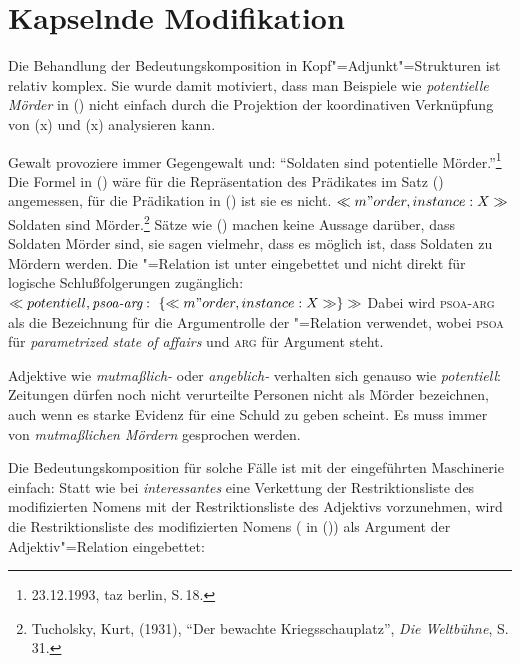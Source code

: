 \section{Kapselnde Modifikation}
\label{sec-kapselnde-Modifikation}

Die Behandlung der Bedeutungskomposition in Kopf"=Adjunkt"=Strukturen ist relativ komplex.
Sie wurde damit motiviert, dass man Beispiele wie \emph{potentielle Mörder} in ()
nicht einfach durch die Projektion der koordinativen Verknüpfung
von (x) und (x) analysieren kann.
\ea
\label{soldat}

Gewalt provoziere immer Gegengewalt und: "`Soldaten sind potentielle Mörder."'\footnote{
23.12.1993, taz berlin, S.\,18.
}
\z
Die Formel in () wäre für die Repräsentation des Prädikates im Satz () angemessen, für
die Prädikation in () ist sie es nicht.
\ea
$\ll m"order, instance:X\gg$
\z
\ea
Soldaten sind Mörder.\footnote{
  Tucholsky, Kurt, (1931), "`Der bewachte Kriegsschauplatz"', \emph{Die Weltbühne}, S.\,31.
}
\z
Sätze wie () machen keine Aussage darüber, dass Soldaten Mörder sind, sie sagen vielmehr,
dass es möglich ist, dass Soldaten zu Mördern werden. Die "=Relation ist unter 
eingebettet und nicht direkt für logische Schlußfolgerungen zugänglich:
\ea
\label{pot}
$\ll potentiell, \textit{psoa-arg} : ~\{ \ll m"order, instance:X\gg \} \gg$
\z
Dabei wird \textsc{psoa-arg} als die Bezeichnung für die Argumentrolle der "=Relation
verwendet, wobei \textsc{psoa} für \emph{parametrized state of affairs} und \textsc{arg} für Argument
steht.

Adjektive wie \emph{mutmaßlich-} oder \emph{angeblich-} verhalten sich genauso wie \emph{potentiell}:
Zeitungen dürfen noch nicht verurteilte Personen nicht als Mörder bezeichnen, auch wenn es starke Evidenz
für eine Schuld zu geben scheint. Es muss immer von \emph{mutmaßlichen Mördern} gesprochen werden.

Die Bedeutungskomposition für solche Fälle ist mit der eingeführten Maschinerie einfach: Statt
wie bei \emph{interessantes} eine Verkettung der Restriktionsliste des modifizierten Nomens mit
der Restriktionsliste des Adjektivs vorzunehmen, wird die Restriktionsliste des modifizierten
Nomens ( in ()) als Argument der Adjektiv"=Relation eingebettet:

